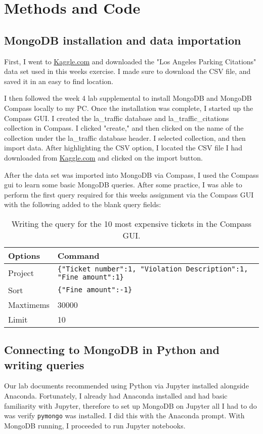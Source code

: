 \documentclass[]{article}
\newcommand{\code}[1]{\colorbox{light-gray}{\texttt{#1}}}
\begin{document}
\section{Methods and Code}
\subsection{MongoDB installation and data importation}
First, I went to \url{Kaggle.com} and downloaded the "Los Angeles Parking Citations" data set used in this weeks exercise.  I made sure to download the CSV file, and saved it in an easy to find location.

I then followed the week 4 lab supplemental to install MongoDB and MongoDB Compass locally to my PC.  Once the installation was complete, I started up the Compass GUI.  I created the la\_traffic database and la\_traffic\_citations collection in Compass. I clicked "create," and then clicked on the name of the collection under the la\_traffic database header.  I selected collection, and then import data.  After highlighting the CSV option, I located the CSV file I had downloaded from \url{Kaggle.com} and clicked on the import button.

After the data set was imported into MongoDB via Compass, I used the Compass gui to learn some basic MongoDB queries.  After some practice, I was able to perform the first query required for this weeks assignment via the Compass GUI with the following added to the blank query fields:
\begin{table}[!ht]
	\centering
	\begin{tabular}{| l | l |}
		\hline
		\textbf{Options} & \textbf{Command} \\
		\hline
		Project & \verb|{"Ticket number":1, "Violation Description":1, "Fine amount":1}| \\
		Sort & \verb|{"Fine amount":-1}| \\
		Maxtimems & 30000 \\
		Limit & 10 \\
		\hline
	\end{tabular}
	\caption{Writing the query for the 10 most expensive tickets in the Compass GUI.}
\end{table}
\subsection{Connecting to MongoDB in Python and writing queries}
Our lab documents recommended using Python via Jupyter installed alongside Anaconda.  Fortunately, I already had Anaconda installed and had basic familiarity with Jupyter, therefore to set up MongoDB on Jupyter all I had to do was verify \code{pymongo} was installed.  I did this with the Anaconda prompt.  With MongoDB running, I proceeded to run Jupyter notebooks.  
\end{document}
